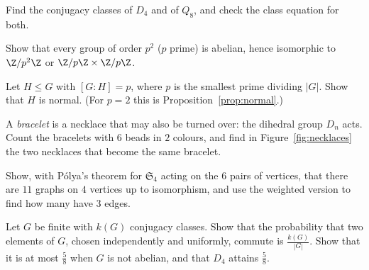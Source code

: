 \begin{exercise}[$\star$]\label{ex:classesD}
Find the conjugacy classes of $D_4$ and of $Q_8$, and check the class equation for both.
\end{exercise}

\begin{exercise}[$\star\star$]\label{ex:p2}
Show that every group of order $p^2$ ($p$ prime) is abelian, hence isomorphic to $\Z/p^2\Z$ or $\Z/p\Z\times\Z/p\Z$.
\end{exercise}

\begin{exercise}[$\star\star$]\label{ex:smallestprime}
Let $H\le G$ with $[G:H]=p$, where $p$ is the smallest prime dividing $|G|$. Show that $H$ is normal. (For $p=2$ this is Proposition~\ref{prop:normal}.)
\end{exercise}

\begin{exercise}[$\star\star$]\label{ex:bracelets}
A \emph{bracelet} is a necklace that may also be turned over: the dihedral group $D_n$ acts. Count the bracelets with $6$ beads in $2$ colours, and find in Figure~\ref{fig:necklaces} the two necklaces that become the same bracelet.
\end{exercise}

\begin{exercise}[$\star\star$]\label{ex:graphs4}
Show, with P\'olya's theorem for $\mathfrak S_4$ acting on the $6$ pairs of vertices, that there are $11$ graphs on $4$ vertices up to isomorphism, and use the weighted version to find how many have $3$ edges.
\end{exercise}

\begin{exercise}[$\star\star\star$]\label{ex:commuting}
Let $G$ be finite with $k(G)$ conjugacy classes. Show that the probability that two elements of $G$, chosen independently and uniformly, commute is $\frac{k(G)}{|G|}$. Show that it is at most $\frac58$ when $G$ is not abelian, and that $D_4$ attains $\frac58$.
\end{exercise}

